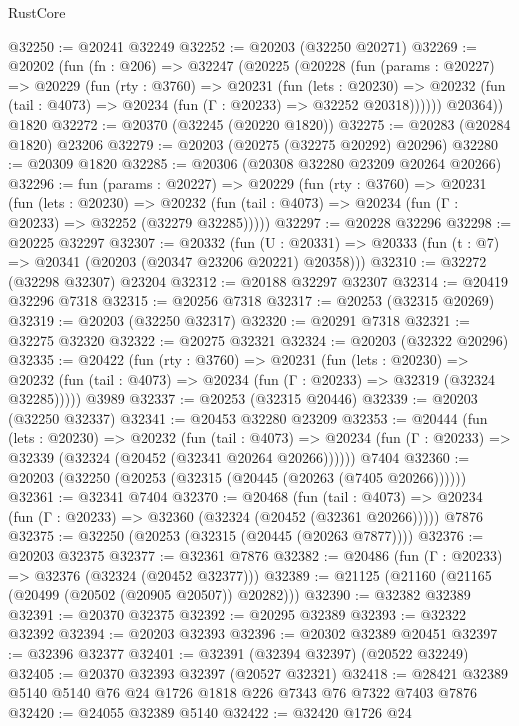 \begin{lexlean}{RustCore}
\begin{coremodule}
@32250 := @20241 @32249
@32252 := @20203 (@32250 @20271)
@32269 := @20202
    (fun (fn : @206) =>
    @32247
      (@20225
        (@20228
          (fun (params : @20227) =>
          @20229
            (fun (rty : @3760) =>
            @20231
              (fun (lets : @20230) =>
              @20232 (fun (tail : @4073) => @20234 (fun (Γ : @20233) => @32252 @20318))))))
        @20364))
    @1820
@32272 := @20370 (@32245 (@20220 @1820))
@32275 := @20283 (@20284 @1820) @23206
@32279 := @20203 (@20275 (@32275 @20292) @20296)
@32280 := @20309 @1820
@32285 := @20306 (@20308 @32280 @23209 @20264 @20266)
@32296 := fun (params : @20227) =>
  @20229
    (fun (rty : @3760) =>
    @20231
      (fun (lets : @20230) =>
      @20232 (fun (tail : @4073) => @20234 (fun (Γ : @20233) => @32252 (@32279 @32285)))))
@32297 := @20228 @32296
@32298 := @20225 @32297
@32307 := @20332
    (fun (U : @20331) => @20333 (fun (t : @7) => @20341 (@20203 (@20347 @23206 @20221) @20358)))
@32310 := @32272 (@32298 @32307) @23204
@32312 := @20188 @32297 @32307
@32314 := @20419 @32296 @7318
@32315 := @20256 @7318
@32317 := @20253 (@32315 @20269)
@32319 := @20203 (@32250 @32317)
@32320 := @20291 @7318
@32321 := @32275 @32320
@32322 := @20275 @32321
@32324 := @20203 (@32322 @20296)
@32335 := @20422
    (fun (rty : @3760) =>
    @20231
      (fun (lets : @20230) =>
      @20232 (fun (tail : @4073) => @20234 (fun (Γ : @20233) => @32319 (@32324 @32285)))))
    @3989
@32337 := @20253 (@32315 @20446)
@32339 := @20203 (@32250 @32337)
@32341 := @20453 @32280 @23209
@32353 := @20444
    (fun (lets : @20230) =>
    @20232
      (fun (tail : @4073) =>
      @20234 (fun (Γ : @20233) => @32339 (@32324 (@20452 (@32341 @20264 @20266))))))
    @7404
@32360 := @20203 (@32250 (@20253 (@32315 (@20445 (@20263 (@7405 @20266))))))
@32361 := @32341 @7404
@32370 := @20468
    (fun (tail : @4073) => @20234 (fun (Γ : @20233) => @32360 (@32324 (@20452 (@32361 @20266)))))
    @7876
@32375 := @32250 (@20253 (@32315 (@20445 (@20263 @7877))))
@32376 := @20203 @32375
@32377 := @32361 @7876
@32382 := @20486 (fun (Γ : @20233) => @32376 (@32324 (@20452 @32377)))
@32389 := @21125 (@21160 (@21165 (@20499 (@20502 (@20905 @20507)) @20282)))
@32390 := @32382 @32389
@32391 := @20370 @32375
@32392 := @20295 @32389
@32393 := @32322 @32392
@32394 := @20203 @32393
@32396 := @20302 @32389 @20451
@32397 := @32396 @32377
@32401 := @32391 (@32394 @32397) (@20522 @32249)
@32405 := @20370 @32393 @32397 (@20527 @32321)
@32418 := @28421 @32389 @5140 @5140 @76 @24 @1726 @1818 @226 @7343 @76 @7322 @7403 @7876
@32420 := @24055 @32389 @5140
@32422 := @32420 @1726 @24

\end{coremodule}
\end{lexlean}
